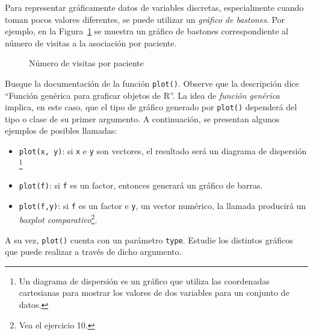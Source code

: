 \documentclass{../prob}
\begin{document}
	\begin{problema}
	Para representar gráficamente datos de variables discretas, especialmente cuando toman pocos valores diferentes, se puede utilizar un \textit{gráfico de bastones}. Por ejemplo, en la Figura~\ref{fig:bast} se muestra un gráfico de bastones correspondiente al número de visitas a la asociación por paciente. 

\begin{figure}[!ht]
    \centering
    
    \caption{Número de visitas por paciente}
    \label{fig:bast}
\end{figure}		
	
	\begin{parte}
	Busque la documentación de la función \texttt{plot()}. Observe que la descripción dice \textquotedblleft Función genérica para graficar objetos de R\textquotedblright . La idea de \textit{función genérica} implica, en este caso, que el tipo de gráfico generado por \texttt{plot()} dependerá del tipo o clase de su primer argumento. A continuación, se presentan algunos ejemplos de posibles llamadas:
	\begin{itemize}
	\item \texttt{plot(x, y)}: si \texttt{x} e \texttt{y} son vectores, el resultado será un diagrama de dispersión \footnote{Un diagrama de dispersión es un gráfico que utiliza las coordenadas cartesianas para mostrar los valores de dos variables para un conjunto de datos.}
	\item \texttt{plot(f)}: si \texttt{f} es un factor, entonces generará un gráfico de barras.
	\item \texttt{plot(f,y)}: si \texttt{f} es un factor e \texttt{y}, un vector numérico, la llamada producirá un \textit{boxplot comparativo}\footnote{Vea el ejercicio 10.}.
	\end{itemize}		
	A su vez, \texttt{plot()} cuenta con un parámetro \texttt{type}. Estudie los distintos gráficos que puede realizar a través de dicho argumento.
	\end{parte}
	

\end{problema}
\end{document}
